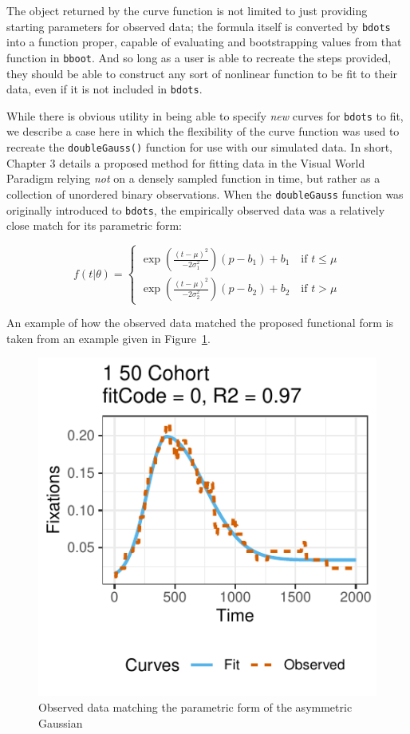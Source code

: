 \documentclass{article}
\newcommand{\xt}{\texttt}%
\begin{document}
The object returned by the curve function is not limited to just providing starting parameters for observed data; the formula itself is converted by \xt{bdots} into a function proper, capable of evaluating and bootstrapping values from that function in \xt{bboot}. And so long as a user is able to recreate the steps provided, they should be able to construct any sort of nonlinear function to be fit to their data, even if it is not included in \xt{bdots}.

While there is obvious utility in being able to specify \textit{new} curves for \xt{bdots} to fit, we describe a case here in which the flexibility of the curve function was used to recreate the \xt{doubleGauss()} function for use with our simulated data. In short, Chapter 3 details a proposed method for fitting data in the Visual World Paradigm relying \textit{not} on a densely sampled function in time, but rather as a collection of unordered binary observations. When the \xt{doubleGauss} function was originally introduced to \xt{bdots}, the empirically observed data was a relatively close match for its parametric form:

\begin{equation}
f(t|\theta) = \begin{cases}
\exp \left( \frac{(t - \mu)^2}{-2\sigma_1^2} \right) (p - b_1) + b_1 \quad \text{if } t \leq \mu \\
\exp \left( \frac{(t - \mu)^2}{-2\sigma_2^2} \right) (p - b_2) + b_2 \quad \text{if } t > \mu
\end{cases}
\end{equation}

An example of how the observed data matched the proposed functional form is taken from an example given in Figure~\ref{fig:bdots_log}.

\begin{figure}[H]
\centering
\includegraphics[scale=1]{img/bdots_logistic.pdf}
\caption{Observed data matching the parametric form of the asymmetric Gaussian}
\label{fig:bdots_log}
\end{figure}
\end{document}
